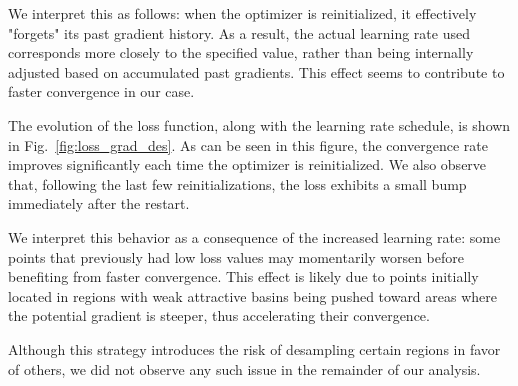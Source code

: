 \documentclass[11pt]{article}
\begin{document}
		We interpret this as follows: when the optimizer is reinitialized, it effectively "forgets" its past gradient history. As a result, the actual learning rate used corresponds more closely to the specified value, rather than being internally adjusted based on accumulated past gradients. This effect seems to contribute to faster convergence in our case. 
		
		The evolution of the loss function, along with the learning rate schedule, is shown in Fig.~\ref{fig:loss_grad_des}. As can be seen in this figure, the convergence rate improves significantly each time the optimizer is reinitialized. We also observe that, following the last few reinitializations, the loss exhibits a small bump immediately after the restart.
		
		We interpret this behavior as a consequence of the increased learning rate: some points that previously had low loss values may momentarily worsen before benefiting from faster convergence. This effect is likely due to points initially located in regions with weak attractive basins being pushed toward areas where the potential gradient is steeper, thus accelerating their convergence.
		
		Although this strategy introduces the risk of desampling certain regions in favor of others, we did not observe any such issue in the remainder of our analysis.
		
\end{document}
